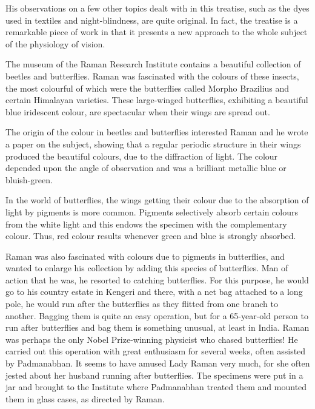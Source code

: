 His observations on a few other topics dealt with in this
treatise, such as the dyes used in textiles and night-blindness, are
quite original. In fact, the treatise is a remarkable piece of work
in that it presents a new approach to the whole subject of the
physiology of vision.

\newpage

\medskip



\noindent
The museum of the Raman Research Institute contains a
beautiful collection of beetles and butterflies. Raman was
fascinated with the colours of these insects, the most colourful
of which were the butterflies called Morpho Brazilius and certain
Himalayan varieties. These large-winged butterflies, exhibiting
a beautiful blue iridescent colour, are spectacular when their wings
are spread out.

The origin of the colour in beetles and butterflies interested
Raman and he wrote a paper on the subject, showing that
a regular periodic structure in their wings produced the beautiful
colours, due to the diffraction of light. The colour depended upon
the angle of observation and was a brilliant metallic blue or
bluish-green.

In the world of butterflies, the wings getting their colour due
to the absorption of light by pigments is more common. Pigments
selectively absorb certain colours from the white light and this
endows the specimen with the complementary colour. Thus, red
colour results whenever green and blue is strongly absorbed.

Raman was also fascinated with colours due to pigments in
butterflies, and wanted to enlarge his collection by adding this
species of butterflies. Man of action that he was, he resorted to
catching butterflies. For this purpose, he would go to his country
estate in Kengeri and there, with a net bag attached to a long
pole, he would run after the butterflies as they flitted from one
branch to another. Bagging them is quite an easy operation, but
for a 65-year-old person to run after butterflies and bag them
is something unusual, at least in India. Raman was perhaps the
only Nobel Prize-winning physicist who chased butterflies!
He carried out this operation with great enthusiasm for several
weeks, often assisted by Padmanabhan. It seems to have amused
Lady Raman very much, for she often jested about her husband
running after butterflies. The specimens were put in a jar and
brought to the Institute where Padmanabhan treated them and
mounted them in glass cases, as directed by Raman.

